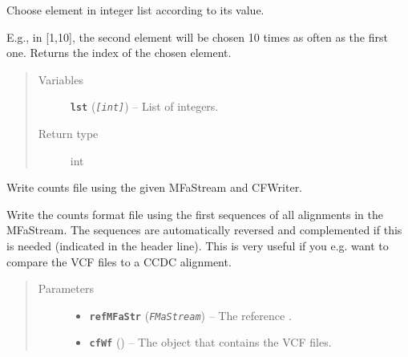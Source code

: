 \documentclass[letterpaper,10pt,english]{sphinxmanual}
\begin{document}

\begin{fulllineitems}
\label{cf:libPoMo.cf.weighted_choice}
Choose element in integer list according to its value.

E.g., in {[}1,10{]}, the second element will be chosen 10 times as
often as the first one.  Returns the index of the chosen element.
\begin{quote}\begin{description}
\item[{Variables}] \leavevmode
\textbf{\texttt{lst}} (\emph{\texttt{{[}int{]}}}) -- List of integers.

\item[{Return type}] \leavevmode
int

\end{description}\end{quote}

\end{fulllineitems}


\begin{fulllineitems}
\label{cf:libPoMo.cf.write_cf_from_MFaStream}
Write counts file using the given MFaStream and CFWriter.

Write the counts format file using the first sequences of all
alignments in the MFaStream.  The sequences are automatically
reversed and complemented if this is needed (indicated in the
header line).  This is very useful if you e.g. want to compare the
VCF files to a CCDC alignment.
\begin{quote}\begin{description}
\item[{Parameters}] \leavevmode\begin{itemize}
\item {} 
\textbf{\texttt{refMFaStr}} (\emph{\texttt{FMaStream}}) -- The reference {\hyperref[fasta:libPoMo.fasta.MFaStream]{}}.

\item {} 
\textbf{\texttt{cfWf}} ({\hyperref[cf:libPoMo.cf.CFWriter]{}}) -- The {\hyperref[cf:libPoMo.cf.CFWriter]{}} object that contains
the VCF files.

\end{itemize}

\end{description}\end{quote}

\end{fulllineitems}
\end{document}
